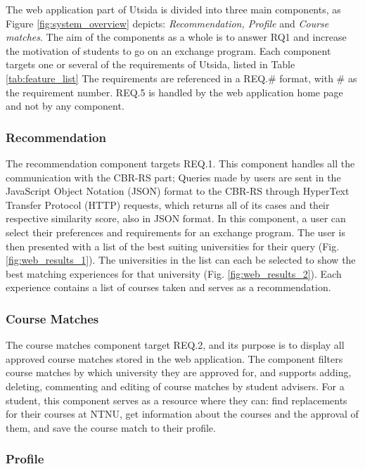 The web application part of Utsida is divided into three main components, as Figure \ref{fig:system_overview} depicts: \emph{Recommendation, Profile} and \emph{Course matches}. The aim of the components as a whole is to answer RQ1 and increase the motivation of students to go on an exchange program. Each component targets one or several of the requirements of Utsida, listed in Table \ref{tab:feature_list} The requirements are referenced in a REQ.\# format, with \# as the requirement number. REQ.5 is handled by the web application home page and not by any component.

\subsubsection{Recommendation}

The recommendation component targets REQ.1. This component handles all the communication with the CBR-RS part; Queries made by users are sent in the JavaScript Object Notation (JSON) format to the CBR-RS through HyperText Transfer Protocol (HTTP) requests, which returns all of its cases and their respective similarity score, also in JSON format. In this component, a user can select their preferences and requirements for an exchange program. The user is then presented with a list of the best suiting universities for their query (Fig. \ref{fig:web_results_1}). The universities in the list can each be selected to show the best matching experiences for that university (Fig. \ref{fig:web_results_2}). Each experience contains a list of courses taken and serves as a recommendation.

\subsubsection{Course Matches}\label{sec_course_matches}

The course matches component target REQ.2, and its purpose is to display all approved course matches stored in the web application. The component filters course matches by which university they are approved for, and supports adding, deleting, commenting and editing of course matches by student advisers. For a student, this component serves as a resource where they can: find replacements for their courses at NTNU, get information about the courses and the approval of them, and save the course match to their profile.

\subsubsection{Profile}

